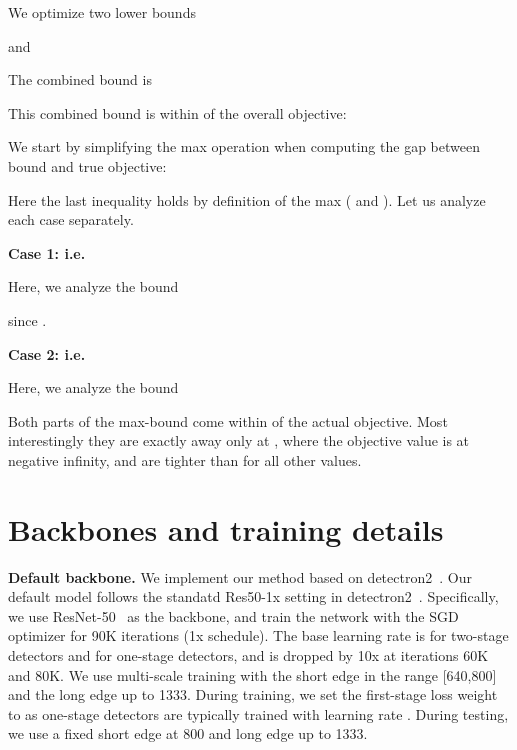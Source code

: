\documentclass{article}
\renewcommand{\paragraph}[1]{\noindent\textbf{#1}}
\begin{document}
We optimize two lower bounds

and

The combined bound is

This combined bound is within  of the overall objective:


We start by simplifying the max operation when computing the gap between bound and true objective:

Here the last inequality holds by definition of the max ( and ).
Let us analyze each case separately.


\paragraph{Case 1:  i.e. }

Here, we analyze the bound

since .

\paragraph{Case 2:  i.e. }

Here, we analyze the bound


Both parts of the max-bound come within  of the actual objective. Most interestingly they are exactly  away only at , where the objective value  is at negative infinity, and are tighter than  for all other values.


\section{Backbones and training details}


\paragraph{Default backbone.}
We implement our method based on detectron2~\cite{wu2019detectron2}.
Our default model follows the standatd Res50-1x setting in detectron2~\cite{wu2019detectron2}.
Specifically, we use ResNet-50~\cite{he2016deep} as the backbone, and train the network with the SGD optimizer for 90K iterations (1x schedule). 
The base learning rate is  for two-stage detectors and  for one-stage detectors, 
and is dropped by 10x at iterations 60K and 80K.
We use multi-scale training with the short edge in the range [640,800] and the long edge up to 1333.
During training, we set the first-stage loss weight to  as one-stage detectors are typically trained with learning rate .
During testing, we use a fixed short edge at 800 and long edge up to 1333.
\end{document}
